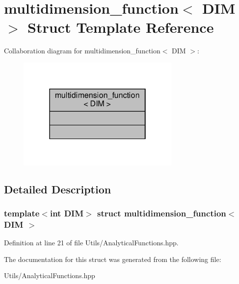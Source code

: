 \hypertarget{structmultidimension__function}{}\section{multidimension\+\_\+function$<$ D\+IM $>$ Struct Template Reference}
\label{structmultidimension__function}


Collaboration diagram for multidimension\+\_\+function$<$ D\+IM $>$\+:\nopagebreak
\begin{figure}[H]
\begin{center}
\leavevmode
\includegraphics[width=226pt]{structmultidimension__function__coll__graph}
\end{center}
\end{figure}


\subsection{Detailed Description}
\subsubsection*{template$<$int D\+IM$>$\newline
struct multidimension\+\_\+function$<$ D\+I\+M $>$}



Definition at line 21 of file Utils/\+Analytical\+Functions.\+hpp.



The documentation for this struct was generated from the following file\+:\begin{DoxyCompactItemize}
\item 
Utils/\+Analytical\+Functions.\+hpp\end{DoxyCompactItemize}

